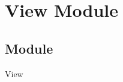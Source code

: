 \documentclass[12pt]{article}
\begin{document}





\newpage

\section* {View Module}

\subsection*{Module}

View
\end{document}
